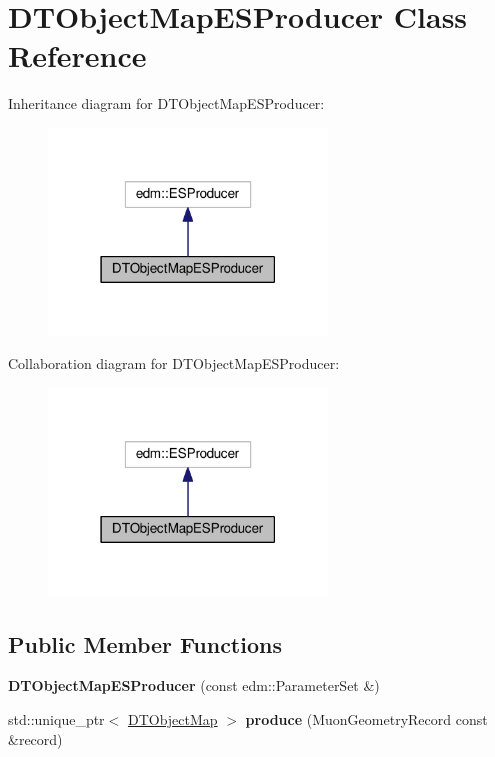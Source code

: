 \hypertarget{classDTObjectMapESProducer}{\section{D\-T\-Object\-Map\-E\-S\-Producer Class Reference}
\label{classDTObjectMapESProducer}
}


Inheritance diagram for D\-T\-Object\-Map\-E\-S\-Producer\-:\nopagebreak
\begin{figure}[H]
\begin{center}
\leavevmode
\includegraphics[width=210pt]{classDTObjectMapESProducer__inherit__graph}
\end{center}
\end{figure}


Collaboration diagram for D\-T\-Object\-Map\-E\-S\-Producer\-:\nopagebreak
\begin{figure}[H]
\begin{center}
\leavevmode
\includegraphics[width=210pt]{classDTObjectMapESProducer__coll__graph}
\end{center}
\end{figure}
\subsection*{Public Member Functions}
\begin{DoxyCompactItemize}
\item 
\hypertarget{classDTObjectMapESProducer_ab248ab7121d7e3febbafa0773d7ac9f6}{{\bfseries D\-T\-Object\-Map\-E\-S\-Producer} (const edm\-::\-Parameter\-Set \&)}\label{classDTObjectMapESProducer_ab248ab7121d7e3febbafa0773d7ac9f6}

\item 
\hypertarget{classDTObjectMapESProducer_a684484dd8a68820cbb4f26bcd0a23e39}{std\-::unique\-\_\-ptr$<$ \hyperlink{classDTObjectMap}{D\-T\-Object\-Map} $>$ {\bfseries produce} (Muon\-Geometry\-Record const \&record)}\label{classDTObjectMapESProducer_a684484dd8a68820cbb4f26bcd0a23e39}

\end{DoxyCompactItemize}
